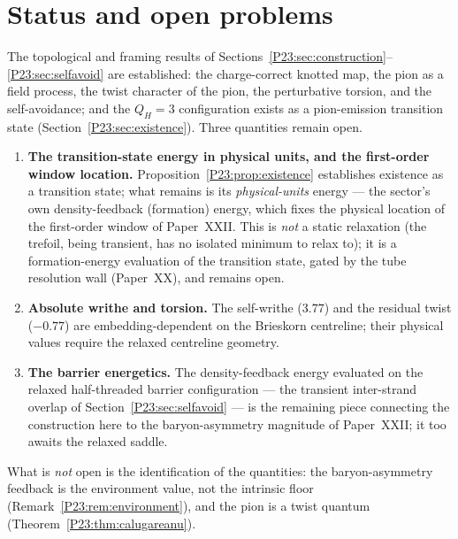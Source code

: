 \documentclass[11pt,a4paper]{article}
\theoremstyle{definition}\newtheorem{definition}[theorem]{Definition}
\newcommand{\QH}{Q_H}
\begin{document}
\section{Status and open problems}
\label{P23:sec:open}
The topological and framing results of Sections~\ref{P23:sec:construction}--%
\ref{P23:sec:selfavoid} are established: the charge-correct knotted map, the pion as a field
process, the twist character of the pion, the perturbative torsion, and the self-avoidance; and
the $\QH=3$ configuration exists as a pion-emission transition state
(Section~\ref{P23:sec:existence}). Three quantities remain open.
\begin{enumerate}[leftmargin=2em]
\item \textbf{The transition-state energy in physical units, and the first-order window location.}
Proposition~\ref{P23:prop:existence} establishes existence as a transition state; what remains is
its \emph{physical-units} energy --- the sector's own density-feedback (formation) energy, which
fixes the physical location of the first-order window of Paper~XXII. This is \emph{not} a static
relaxation (the trefoil, being transient, has no isolated minimum to relax to); it is a
formation-energy evaluation of the transition state, gated by the tube resolution wall (Paper~XX),
and remains open.
\item \textbf{Absolute writhe and torsion.} The self-writhe ($3.77$) and the residual twist
($-0.77$) are embedding-dependent on the Brieskorn centreline; their physical values require the
relaxed centreline geometry.
\item \textbf{The barrier energetics.} The density-feedback energy evaluated on the relaxed
half-threaded barrier configuration --- the transient inter-strand overlap of
Section~\ref{P23:sec:selfavoid} --- is the remaining piece connecting the construction here to the
baryon-asymmetry magnitude of Paper~XXII; it too awaits the relaxed saddle.
\end{enumerate}
What is \emph{not} open is the identification of the quantities: the baryon-asymmetry feedback is
the environment value, not the intrinsic floor (Remark~\ref{P23:rem:environment}), and the pion is
a twist quantum (Theorem~\ref{P23:thm:calugareanu}).
\end{document}
